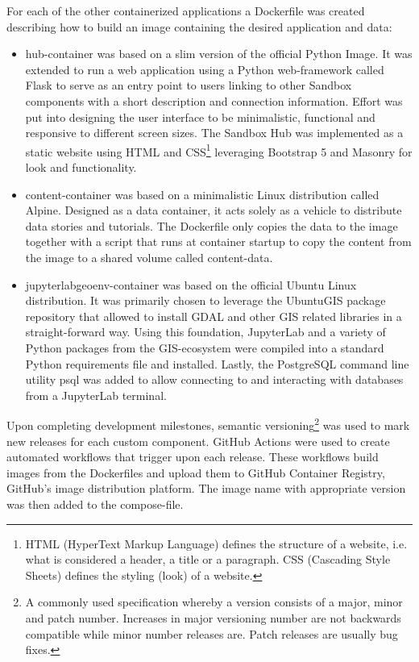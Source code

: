 \documentclass[11pt, a4paper, oneside, parskip=full-]{scrartcl}
\begin{document}
For each of the other containerized applications a Dockerfile was created
describing how to build an image containing the desired application and data:

\begin{itemize}
  \item hub-container was based on a slim version of the official Python
  Image\cite{pythonimage}. It was extended to run a web application using a
  Python web-framework called Flask\cite{flask} to serve as an entry point to
  users linking to other Sandbox components with a short description and
  connection information. Effort was put into designing the user interface to be
  minimalistic, functional and responsive to different screen sizes. The Sandbox
  Hub was implemented as a static website using HTML and CSS\footnote{HTML
  (HyperText Markup Language) defines the structure of a website, i.e. what is
  considered a header, a title or a paragraph. CSS (Cascading Style Sheets)
  defines the styling (look) of a website.} leveraging Bootstrap
  5\cite{bootstrap5} and Masonry\cite{masonry} for look and functionality.
  \item content-container was based on a minimalistic Linux distribution called
  Alpine\cite{alpinelinux}. Designed as a data container, it acts solely as a
  vehicle to distribute data stories and tutorials. The Dockerfile only copies
  the data to the image together with a script that runs at container startup to
  copy the content from the image to a shared volume called content-data.
  \item jupyterlabgeoenv-container was based on the official Ubuntu Linux
  distribution\cite{ubuntulinux}. It was primarily chosen to leverage the
  UbuntuGIS package repository\cite{ubuntugisppa} that allowed to install GDAL
  and other GIS related libraries in a straight-forward way. Using this
  foundation, JupyterLab and a variety of Python packages from the GIS-ecosystem
  were compiled into a standard Python requirements
  file\cite{piprequirementsfile} and installed. Lastly, the PostgreSQL command
  line utility psql was added to allow connecting to and interacting with
  databases from a JupyterLab terminal.
\end{itemize}

Upon completing development milestones, semantic versioning\footnote{A commonly
used specification whereby a version consists of a major, minor and patch
number. Increases in major versioning number are not backwards compatible while
minor number releases are. Patch releases are usually bug fixes.} was used to
mark new releases for each custom component. GitHub Actions\cite{githubactions}
were used to create automated workflows that trigger upon each release. These
workflows build images from the Dockerfiles and upload them to GitHub Container
Registry\cite{gcr}, GitHub's image distribution platform. The image name with
appropriate version was then added to the compose-file.
\end{document}

